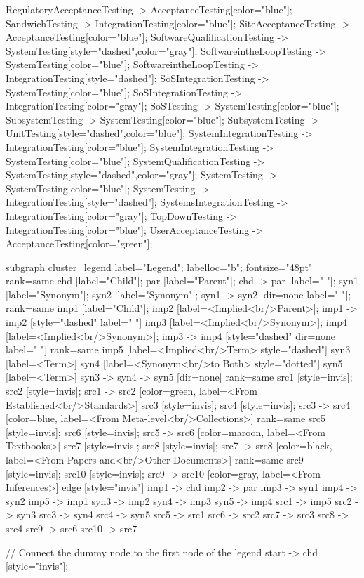 \documentclass{article}
\begin{document}
{RegulatoryAcceptanceTesting -> AcceptanceTesting[color="blue"];
SandwichTesting -> IntegrationTesting[color="blue"];
SiteAcceptanceTesting -> AcceptanceTesting[color="blue"];
SoftwareQualificationTesting -> SystemTesting[style="dashed",color="gray"];
SoftwareintheLoopTesting -> SystemTesting[color="blue"];
SoftwareintheLoopTesting -> IntegrationTesting[style="dashed"];
SoSIntegrationTesting -> SystemTesting[color="blue"];
SoSIntegrationTesting -> IntegrationTesting[color="gray"];
SoSTesting -> SystemTesting[color="blue"];
SubsystemTesting -> SystemTesting[color="blue"];
SubsystemTesting -> UnitTesting[style="dashed",color="blue"];
SystemIntegrationTesting -> IntegrationTesting[color="blue"];
SystemIntegrationTesting -> SystemTesting[color="blue"];
SystemQualificationTesting -> SystemTesting[style="dashed",color="gray"];
SystemTesting -> SystemTesting[color="blue"];
SystemTesting -> IntegrationTesting[style="dashed"];
SystemsIntegrationTesting -> IntegrationTesting[color="gray"];
TopDownTesting -> IntegrationTesting[color="blue"];
UserAcceptanceTesting -> AcceptanceTesting[color="green"];

subgraph cluster_legend {
    label="Legend";
    labelloc="b";
    fontsize="48pt"
    {
        rank=same
        chd [label="Child"];
        par [label="Parent"];
        chd -> par [label="                "];
        syn1 [label="Synonym"];
        syn2 [label="Synonym"];
        syn1 -> syn2 [dir=none label="                "];
    }
    {
        rank=same
        imp1 [label="Child"];
        imp2 [label=<Implied<br/>Parent>];
        imp1 -> imp2 [style="dashed" label="                "]
        imp3 [label=<Implied<br/>Synonym>];
        imp4 [label=<Implied<br/>Synonym>];
        imp3 -> imp4 [style="dashed" dir=none label="                "]
    }
    {
        rank=same
        imp5 [label=<Implied<br/>Term> style="dashed"]
        syn3 [label=<Term>]
        syn4 [label=<Synonym<br/>to Both> style="dotted"]
        syn5 [label=<Term>]
        syn3 -> syn4 -> syn5 [dir=none]
    }
{
rank=same
src1 [style=invis];
src2 [style=invis];
src1 -> src2 [color=green, label=<From Established<br/>Standards>]
src3 [style=invis];
src4 [style=invis];
src3 -> src4 [color=blue, label=<From Meta-level<br/>Collections>]
}
{
rank=same
src5 [style=invis];
src6 [style=invis];
src5 -> src6 [color=maroon, label=<From Textbooks>]
src7 [style=invis];
src8 [style=invis];
src7 -> src8 [color=black, label=<From Papers and<br/>Other Documents>]
}
{
rank=same
src9 [style=invis];
src10 [style=invis];
src9 -> src10 [color=gray, label=<From Inferences>]
}
    edge [style="invis"]
    imp1 -> chd
    imp2 -> par
    imp3 -> syn1
    imp4 -> syn2
imp5 -> imp1
syn3 -> imp2
syn4 -> imp3
syn5 -> imp4
src1 -> imp5
src2 -> syn3
src3 -> syn4
src4 -> syn5
src5 -> src1
src6 -> src2
src7 -> src3
src8 -> src4
src9 -> src6
src10 -> src7
}

// Connect the dummy node to the first node of the legend
start -> chd [style="invis"];
}
\end{document}
